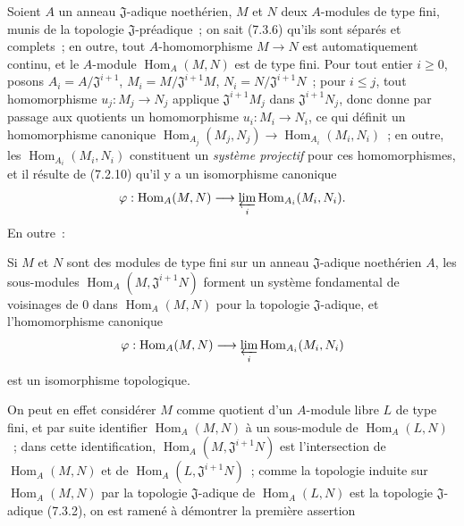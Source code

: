 \begin{env}[7.8.1]
\label{0.7.8.1-fr}
Soient $A$ un anneau $\mathfrak J$-adique noethérien, $M$ et $N$ deux
$A$-modules de type fini, munis de la topologie $\mathfrak J$-préadique~;
on sait (7.3.6) qu'ils sont séparés et complets~; en outre, tout
$A$-homomorphisme $M\to N$ est automatiquement continu, et le $A$-module
$\operatorname{Hom}_A(M,N)$ est de type fini. Pour tout entier $i\geq 0$, posons
$A_i=A/\mathfrak J^{i+1}$, $M_i=M/\mathfrak J^{i+1}M$,
$N_i=N/\mathfrak J^{i+1}N$~; pour $i\leq j$, tout homomorphisme
$u_j:M_j\to N_j$ applique $\mathfrak J^{i+1}M_j$ dans
$\mathfrak J^{i+1}N_j$, donc donne par passage aux quotients un
homomorphisme $u_i:M_i\to N_i$, ce qui définit un homomorphisme canonique
$\operatorname{Hom}_{A_j}(M_j,N_j)\to\operatorname{Hom}_{A_i}(M_i,N_i)$~; en outre, les
$\operatorname{Hom}_{A_i}(M_i,N_i)$ constituent un \emph{système projectif} pour ces
homomorphismes, et il résulte de (7.2.10) qu'il y a un isomorphisme
canonique
\[
  \varphi:\operatorname{Hom}_A(M,N)\longrightarrow
  \varprojlim_i\operatorname{Hom}_{A_i}(M_i,N_i).
\]
En outre~:
\end{env}

\begin{proposition}[7.8.2]
\label{0.7.8.2-fr}
Si $M$ et $N$ sont des modules de type fini sur un anneau $\mathfrak J$-adique
noethérien $A$, les sous-modules $\operatorname{Hom}_A(M,\mathfrak J^{i+1}N)$ forment un
système fondamental de voisinages de $0$ dans $\operatorname{Hom}_A(M,N)$ pour la
topologie $\mathfrak J$-adique, et l'homomorphisme canonique
\[
  \varphi:\operatorname{Hom}_A(M,N)\longrightarrow
  \varprojlim_i\operatorname{Hom}_{A_i}(M_i,N_i)
\]
est un isomorphisme topologique.
\end{proposition}

On peut en effet considérer $M$ comme quotient d'un $A$-module libre $L$ de
type fini, et par suite identifier $\operatorname{Hom}_A(M,N)$ à un sous-module de
$\operatorname{Hom}_A(L,N)$~; dans cette identification,
$\operatorname{Hom}_A(M,\mathfrak J^{i+1}N)$ est l'intersection de $\operatorname{Hom}_A(M,N)$ et de
$\operatorname{Hom}_A(L,\mathfrak J^{i+1}N)$~; comme la topologie induite sur
$\operatorname{Hom}_A(M,N)$ par la topologie $\mathfrak J$-adique de $\operatorname{Hom}_A(L,N)$ est
la topologie $\mathfrak J$-adique (7.3.2), on est ramené à démontrer la
première assertion

